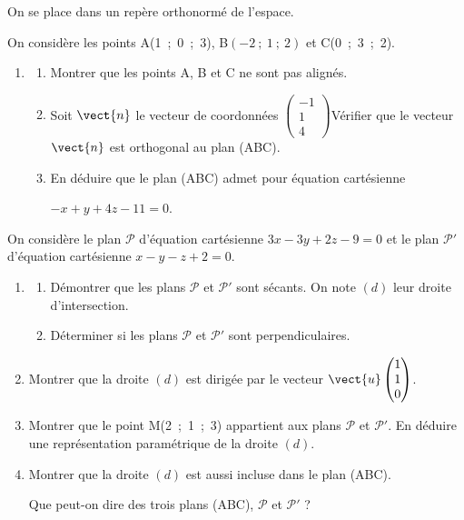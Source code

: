 On se place dans un repère orthonormé \Oijk de l'espace.

On considère les points A(1~;~0~;~3), B$( -2~;~1~;~2)$ et C(0~;~3~;~2).

\medskip

\begin{enumerate}
\item 
	\begin{enumerate}
		\item Montrer que les points A, B et C ne sont pas alignés.
		\item Soit $\vect{n}$ le vecteur de coordonnées $\begin{pmatrix}-1\\1\\4\end{pmatrix}$Vérifier que le vecteur $\vect{n}$ est orthogonal au plan (ABC).
		\item En déduire que le plan (ABC) admet pour équation cartésienne 

$-x + y + 4z - 11 = 0$.
	\end{enumerate}
\end{enumerate}

On considère le plan $\mathcal{P}$ d'équation cartésienne $3x - 3y + 2z - 9 = 0$ et le plan $\mathcal{P}'$ d'équation cartésienne $x - y- z + 2 = 0$.

\begin{enumerate}[resume]
\item 
	\begin{enumerate}
		\item Démontrer que les plans $\mathcal{P}$ et $\mathcal{P}'$ sont sécants. On note $(d)$ leur droite d'intersection.
		\item Déterminer si les plans $\mathcal{P}$ et $\mathcal{P}'$ sont perpendiculaires.
	\end{enumerate}
\item Montrer que la droite $(d)$ est dirigée par le vecteur $\vect{u}\begin{pmatrix}1\\1\\0\end{pmatrix}$.
\item Montrer que le point M(2~;~1~;~3) appartient aux plans $\mathcal{P}$ et $\mathcal{P}'$. En déduire une représentation paramétrique de la droite $(d)$.
\item Montrer que la droite $(d)$ est aussi incluse dans le plan (ABC).

Que peut-on dire des trois plans (ABC), $\mathcal{P}$ et $\mathcal{P}'$ ?
\end{enumerate}
